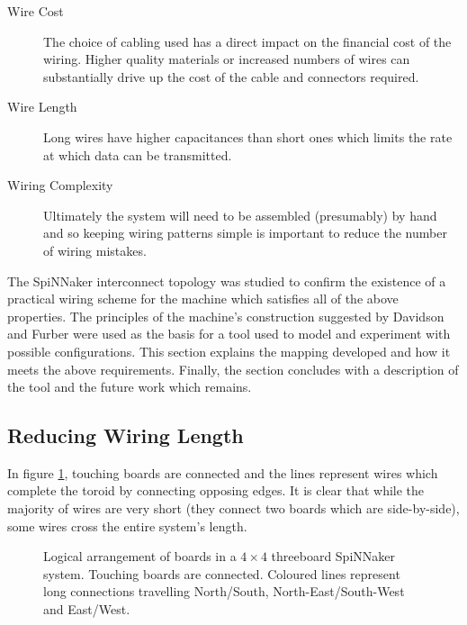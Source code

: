 		\begin{description}
			
			\item[Wire Cost] The choice of cabling used has a direct impact on the
			financial cost of the wiring. Higher quality materials or increased
			numbers of wires can substantially drive up the cost of the cable and
			connectors required.
			
			\item[Wire Length] Long wires have higher capacitances than short ones
			which limits the rate at which data can be transmitted.
			
			\item[Wiring Complexity] Ultimately the system will need to be assembled
			(presumably) by hand and so keeping wiring patterns simple is important to
			reduce the number of wiring mistakes.
			
		\end{description}
		
		The SpiNNaker interconnect topology was studied to confirm the existence of
		a practical wiring scheme for the machine which satisfies all of the above
		properties. The principles of the machine's construction suggested by
		Davidson \cite{davidsonWiring} and Furber \cite{furber13email} were used as
		the basis for a tool used to model and experiment with possible
		configurations. This section explains the mapping developed and how it
		meets the above requirements. Finally, the section concludes with a
		description of the tool and the future work which remains.
		
		\subsection{Reducing Wiring Length}
			
			\label{sec:folding-toroids}
			
			In figure \ref{fig:boardsLogical},
			touching boards are connected and the lines represent wires which complete
			the toroid by connecting opposing edges. It is clear that while the
			majority of wires are very short (they connect two boards which are
			side-by-side), some wires cross the entire system's length.
			
			\begin{figure}
				\center
				
				\caption[Logical arrangement of boards in a $4\times4$ threeboard
				SpiNNaker system.]{Logical arrangement of boards in a $4\times4$
				threeboard SpiNNaker system. Touching boards are connected. Coloured
				lines represent long connections travelling {\color{red}North/South},
				{\color{green}North-East/South-West} and {\color{blue}East/West}.}
				\label{fig:boardsLogical}
			\end{figure}
			
